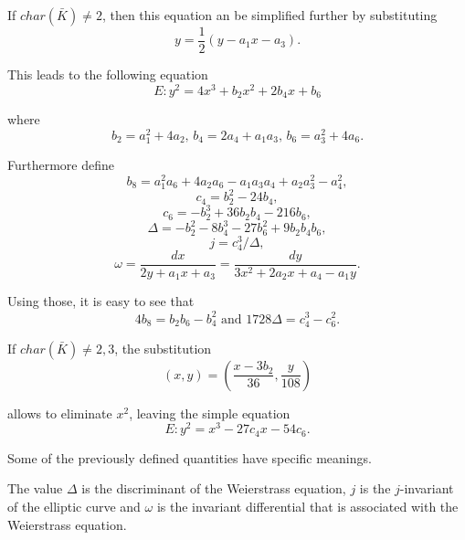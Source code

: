 If $char(\bar{K})\neq 2$, then this equation an be simplified further by substituting
\begin{equation*}
y=\frac{1}{2}(y-a_1x-a_3).
\end{equation*}

This leads to the following equation
\begin{equation*}
E:y^2=4x^3+b_2x^2+2b_4x+b_6
\end{equation*}

where
\begin{equation*}
{b_2=a_1^2+4a_2}\text{,		}{b_4=2a_4+a_1a_3}\text{,	}{b_6=a_3^2+4a_6}.
\end{equation*}

Furthermore define
\begin{equation*}
b_8=a_1^2a_6+4a_2a_6-a_1a_3a_4+a_2a_3^2-a_4^2,
\end{equation*}
\begin{equation*}
c_4=b_2^2-24b_4,
\end{equation*}
\begin{equation*}
c_6=-b_2^3+36b_2b_4-216b_6,
\end{equation*}
\begin{equation*}
\Delta=-b_2^2-8b_4^3-27b_6^2+9b_2b_4b_6,
\end{equation*}
\begin{equation*}
j=c_4^3/\Delta,
\end{equation*}
\begin{equation*}
\omega=\frac{dx}{2y+a_1x+a_3}=\frac{dy}{3x^2+2a_2x+a_4-a_1y}.
\end{equation*}


Using those, it is easy to see that
\begin{equation*}
4b_8=b_2b_6-b_4^2\text{ and }1728\Delta=c_4^3-c_6^2.
\end{equation*}


If $char(\bar{K})\neq 2,3$, the substitution
\begin{equation*}
(x,y)=(\frac{x-3b_2}{36},\frac{y}{108})
\end{equation*}

allows to eliminate $x^2$, leaving the simple equation
\begin{equation*}
E:y^2=x^3-27c_4x-54c_6.
\end{equation*}

Some of the previously defined quantities have specific meanings.
\begin{defn}
	The value $\Delta$ is the discriminant of the Weierstrass equation, $j$ is the $j$-invariant of the elliptic curve and $\omega$ is the invariant differential that is associated with the Weierstrass equation.
\end{defn}

